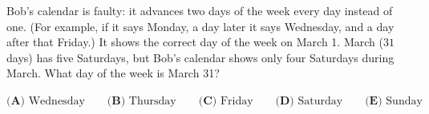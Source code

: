 Bob's calendar is faulty: it advances two days of the week every day instead of one. (For example, if it says Monday, a day later it says Wednesday, and a day after that Friday.) It shows the correct day of the week on March 1. March ($31$ days) has five Saturdays, but Bob's calendar shows only four Saturdays during March. What day of the week is March 31?

$\textbf{(A) }\text{Wednesday}\qquad\textbf{(B) }\text{Thursday}\qquad\textbf{(C) }\text{Friday}\qquad\textbf{(D) }\text{Saturday}\qquad\textbf{(E) }\text{Sunday}$
